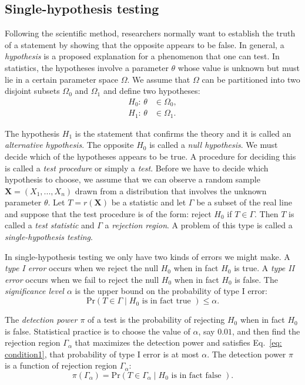 \documentclass[10pt]{article}
\begin{document}
\subsection{Single-hypothesis testing}
Following the scientific method, researchers normally want to establish the truth of a statement by showing that the opposite appears to be false. In general, a {\it hypothesis} is a proposed explanation for a phenomenon that one can test. In statistics, the hypotheses involve a parameter $\theta$ whose value is unknown but must lie in a certain parameter space $\Omega$. We assume that $\Omega$ can be partitioned into two disjoint subsets $\Omega_0$ and $\Omega_1$ and define two hypotheses:
\begin{align*}
H_{0}\text{: } \theta &\in \Omega_0, \\
H_{1}\text{: } \theta &\in \Omega_1.
\end{align*}

The hypothesis $H_{1}$ is the statement that confirms the theory and it is called an {\it alternative hypothesis}. The opposite $H_{0}$ is called a {\it null hypothesis}. We must decide which of the hypotheses appears to be true. A procedure for deciding this is called a {\it test procedure} or simply a {\it test}. Before we have to decide which hypothesis to choose, we assume that we can observe a random sample $\mathbf{X} = (X_{1}, ..., X_{n})$ drawn from a distribution that involves the unknown parameter $\theta$. Let $T = r(\mathbf{X})$ be a statistic and let $\Gamma$ be a subset of the real line and suppose that the test procedure is of the form: reject $H_{0}$ if $T \in \Gamma$. Then $T$ is called a {\it test statistic} and $\Gamma$ a {\it rejection region}. A problem of this type is called a {\it single-hypothesis testing}.

In single-hypothesis testing we only have two kinds of errors we might make. A {\it type I error} occurs when we reject the null $H_{0}$ when in fact $H_{0}$ is true. A {\it type II error} occurs when we fail to reject the null $H_{0}$ when in fact $H_{0}$ is false. The {\it significance level $\alpha$} is the upper bound on the probability of type I error:
\begin{equation} \label{eq: condition1}
	\text{Pr}(T \in \Gamma \mid H_{0} \text{ is in fact true }) \leq \alpha.
\end{equation}

The {\it detection power $\pi$} of a test is the probability of rejecting $H_{0}$ when in fact $H_{0}$ is false. Statistical practice is to choose the value of $\alpha$, say $0.01$, and then find the rejection region $\Gamma_{\alpha}$ that maximizes the detection power and satisfies Eq.~\ref{eq: condition1}, that probability of type I error is at most $\alpha$. The detection power $\pi$ is a function of rejection region $\Gamma_{\alpha}$:
\begin{equation}
	\pi(\Gamma_{\alpha}) = \text{Pr}(T \in \Gamma_{\alpha} \mid H_{0} \text{ is in fact false }).
\end{equation}
\end{document}
